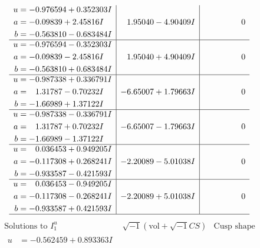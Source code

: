 \documentclass[1p]{elsarticle_modified}
\theoremstyle{definition}
\newcommand{\I}{\sqrt{-1}}
\begin{document}
$$\begin{array}{c|c|c}
\begin{aligned}
u &= -0.976594 + 0.352303 I \\
a &= -0.09839 + 2.45816 I \\
b &= -0.563810 - 0.683484 I\end{aligned}
 & \phantom{-}1.95040 - 4.90409 I & \phantom{-0.000000 } 0 \\ \hline\begin{aligned}
u &= -0.976594 - 0.352303 I \\
a &= -0.09839 - 2.45816 I \\
b &= -0.563810 + 0.683484 I\end{aligned}
 & \phantom{-}1.95040 + 4.90409 I & \phantom{-0.000000 } 0 \\ \hline\begin{aligned}
u &= -0.987338 + 0.336791 I \\
a &= \phantom{-}1.31787 - 0.70232 I \\
b &= -1.66989 + 1.37122 I\end{aligned}
 & -6.65007 + 1.79663 I & \phantom{-0.000000 } 0 \\ \hline\begin{aligned}
u &= -0.987338 - 0.336791 I \\
a &= \phantom{-}1.31787 + 0.70232 I \\
b &= -1.66989 - 1.37122 I\end{aligned}
 & -6.65007 - 1.79663 I & \phantom{-0.000000 } 0 \\ \hline\begin{aligned}
u &= \phantom{-}0.036453 + 0.949205 I \\
a &= -0.117308 + 0.268241 I \\
b &= -0.933587 - 0.421593 I\end{aligned}
 & -2.20089 - 5.01038 I & \phantom{-0.000000 } 0 \\ \hline\begin{aligned}
u &= \phantom{-}0.036453 - 0.949205 I \\
a &= -0.117308 - 0.268241 I \\
b &= -0.933587 + 0.421593 I\end{aligned}
 & -2.20089 + 5.01038 I & \phantom{-0.000000 } 0\\
 \hline 
 \end{array}$$\newpage$$\begin{array}{c|c|c}  
\text{Solutions to }I^u_{1}& \I (\text{vol} + \sqrt{-1}CS) & \text{Cusp shape}\\
 \hline 
\begin{aligned}
u &= -0.562459 + 0.893363 I \\

\end{aligned}
\end{array}$$
\end{document}
